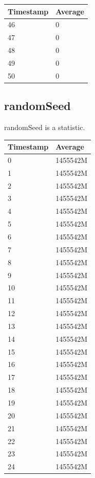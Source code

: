 \begin{tabular}{|l||l|}
\hline
	\textbf{Timestamp} & \textbf{Average} \\ \hline
	46 & 0 \\ \hline
	47 & 0 \\ \hline
	48 & 0 \\ \hline
	49 & 0 \\ \hline
	50 & 0 \\ \hline
\end{tabular}

\subsection{randomSeed}
randomSeed is a statistic.

%
%
\begin{tabular}{|l||l|}
\hline
	\textbf{Timestamp} & \textbf{Average} \\ \hline
	0 & 1455542M \\ \hline
	1 & 1455542M \\ \hline
	2 & 1455542M \\ \hline
	3 & 1455542M \\ \hline
	4 & 1455542M \\ \hline
	5 & 1455542M \\ \hline
	6 & 1455542M \\ \hline
	7 & 1455542M \\ \hline
	8 & 1455542M \\ \hline
	9 & 1455542M \\ \hline
	10 & 1455542M \\ \hline
	11 & 1455542M \\ \hline
	12 & 1455542M \\ \hline
	13 & 1455542M \\ \hline
	14 & 1455542M \\ \hline
	15 & 1455542M \\ \hline
	16 & 1455542M \\ \hline
	17 & 1455542M \\ \hline
	18 & 1455542M \\ \hline
	19 & 1455542M \\ \hline
	20 & 1455542M \\ \hline
	21 & 1455542M \\ \hline
	22 & 1455542M \\ \hline
	23 & 1455542M \\ \hline
	24 & 1455542M \\ \hline

\end{tabular}
